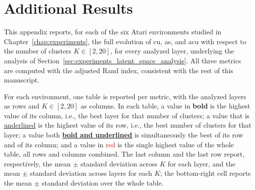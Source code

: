 \renewcommand{\thechapter}{\arabic{chapter}}
\setcounter{topnumber}{6}
\setcounter{bottomnumber}{6}
\setcounter{totalnumber}{6}
\renewcommand{\topfraction}{0.98}
\renewcommand{\bottomfraction}{0.98}
\renewcommand{\textfraction}{0.02}
\renewcommand{\floatpagefraction}{0.3}
\setlength{\floatsep}{4pt plus 1pt minus 1pt}
\setlength{\textfloatsep}{6pt plus 1pt minus 1pt}
\setlength{\intextsep}{4pt plus 1pt minus 1pt}
\setlength{\abovecaptionskip}{3pt}
\setlength{\belowcaptionskip}{3pt}

\chapter{Additional Results}
\label{chap:appendix}

This appendix reports, for each of the six Atari environments studied in Chapter~\ref{chap:experiments}, the full evolution of \gls{cu}, \gls{as}, and \gls{acu} with respect to the number of clusters $K \in [2,20]$, for every analyzed layer, underlying the analysis of Section~\ref{sec:experiments_latent_space_analysis}. All three metrics are computed with the adjusted Rand index, consistent with the rest of this manuscript.

For each environment, one table is reported per metric, with the analyzed layers as rows and $K \in [2,20]$ as columns. In each table, a value in \textbf{bold} is the highest value of its column, i.e., the best layer for that number of clusters; a value that is \underline{underlined} is the highest value of its row, i.e., the best number of clusters for that layer; a value both \textbf{\underline{bold and underlined}} is simultaneously the best of its row and of its column; and a value in \textcolor{red}{red} is the single highest value of the whole table, all rows and columns combined. The last column and the last row report, respectively, the mean $\pm$ standard deviation across $K$ for each layer, and the mean $\pm$ standard deviation across layers for each $K$; the bottom-right cell reports the mean $\pm$ standard deviation over the whole table.

